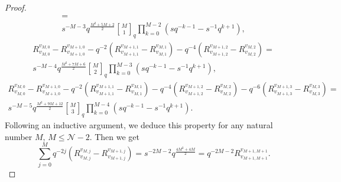 \documentclass[reqno,a4paper,11pt]{amsart}
\numberwithin{equation}{section}
\numberwithin{figure}{section}
\theoremstyle{definition}
\theoremstyle{plain}
\newcommand{\cN}{\mathcal{N}}
\renewcommand{\leq}{\leqslant}
\begin{document}
\begin{proof}
\begin{multline*}
=
\\
s^{-M-3}q^{\frac{M^2+5M+2}{2}} 
 {M \brack 1}_q 
 \prod_{k=0}^{M-2}(sq^{-k-1}-s^{-1}q^{k+1}),
 \end{multline*}
 \begin{multline*}
R_{v_{M,0}}^{v_{M,0}}
-
R_{v_{M+1,0}}^{v_{M+1,0}}
-
q^{-2} (R_{v_{M+1,1}}^{v_{M+1,1}}
-
R_{v_{M,1}}^{v_{M,1}})
-
q^{-4} (R_{v_{M+1,2}}^{v_{M+1,2}}
-
R_{v_{M,2}}^{v_{M,2}})
=
\\
s^{-M-4}q^{\frac{M^2+7M+6}{2}} 
 {M \brack 2}_q 
 \prod_{k=0}^{M-3}(sq^{-k-1}-s^{-1}q^{k+1}),
 \end{multline*}
%
 \begin{multline*}
R_{v_{M,0}}^{v_{M,0}}
-
R_{v_{M+1,0}}^{v_{M+1,0}}
-
q^{-2} (R_{v_{M+1,1}}^{v_{M+1,1}}
-
R_{v_{M,1}}^{v_{M,1}})
-
q^{-4} (R_{v_{M+1,2}}^{v_{M+1,2}}
-
R_{v_{M,2}}^{v_{M,2}})
-
q^{-6} (R_{v_{M+1,3}}^{v_{M+1,3}}
-
R_{v_{M,3}}^{v_{M,3}})
=
\\
s^{-M-5}q^{\frac{M^2+9M+12}{2}} 
 {M \brack 3}_q 
 \prod_{k=0}^{M-4}(sq^{-k-1}-s^{-1}q^{k+1}).
 \end{multline*}
%
Following an inductive argument, we deduce this property for any natural number $M$, $M \leq \cN-2$. Then we get
\begin{equation*}
\sum_{j=0}^M
q^{-2j}\left(
R_{v_{M,j}}^{v_{M,j}}
-
R_{v_{M+1,j}}^{v_{M+1,j}}
\right)
=
s^{-2M-2}q^{\frac{4M^2+4M}{2}} 
=
q^{-2M-2}
R_{v_{M+1,M+1}}^{v_{M+1,M+1}}.
\end{equation*}
\end{proof}
\end{document}
